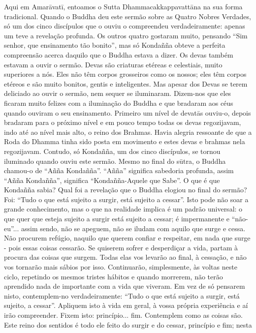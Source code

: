 Aqui em Amarāvatī, entoamos o Sutta Dhammacakkappavattāna na sua forma tradicional. Quando o Buddha deu
este sermão sobre as Quatro Nobres Verdades, só um dos
cinco discípulos que o ouviu o compreendeu verdadeiramente: apenas um teve a revelação profunda. Os outros quatro
gostaram muito, pensando “Sim senhor, que ensinamento tão
bonito”, mas só Kondañña obteve a perfeita compreensão
acerca daquilo que o Buddha estava a dizer.
Os devas também estavam a ouvir o sermão. Devas são
criaturas etéreas e celestiais, muito superiores a nós. Eles não
têm corpos grosseiros como os nossos; eles têm corpos etéreos
e são muito bonitos, gentis e inteligentes. Mas apesar dos
Devas se terem deliciado ao ouvir o sermão, nem sequer se
iluminaram.
Dizem-nos que eles ficaram muito felizes com a iluminação do Buddha e que bradaram aos céus quando ouviram o
seu ensinamento. Primeiro um nível de devatās ouviu-o,
depois bradaram para o próximo nível e em pouco tempo
todas os devas regozijavam, indo até ao nível mais alto, o
reino dos Brahmas. Havia alegria ressoante de que a Roda do
Dhamma tinha sido posta em movimento e estes devas e
brahmas nela regozijavam. Contudo, só Kondañña, um dos
cinco discípulos, se tornou iluminado quando ouviu este sermão. Mesmo no final do sūtra, o Buddha chamou-o de “Añña
Kondañña”. “Añña” significa sabedoria profunda, assim
“Añña Kondañña”, significa “Kondañña-Aquele que Sabe”.
O que é que Kondañña sabia? Qual foi a revelação que o
Buddha elogiou no final do sermão? Foi: “Tudo o que está
sujeito a surgir, está sujeito a cessar”. Isto pode não soar a
grande conhecimento, mas o que na realidade implica é um
padrão universal: o que quer que esteja sujeito a surgir está
sujeito a cessar; é impermanente e “não-eu”... assim sendo,
não se apeguem, não se iludam com aquilo que surge e cessa.
Não procurem refúgio, naquilo que querem confiar e
respeitar, em nada que surge - pois essas coisas cessarão.
Se quiserem sofrer e desperdiçar a vida, partam à procura
das coisas que surgem. Todas elas vos levarão ao final, à
cessação, e não vos tornarão mais sábios por isso.
Continuarão, simplesmente, às voltas neste ciclo, repetindo
os mesmos tristes hábitos e quando morrerem, não terão
aprendido nada de importante com a vida que viveram.
Em vez de só pensarem nisto, contemplem-no verdadeiramente: “Tudo o que está sujeito a surgir, está sujeito, a
cessar”. Apliquem isto à vida em geral, à vossa própria
experiência e aí irão compreender. Fixem isto: princípio...
fim. Contemplem como as coisas são. Este reino dos sentidos
é todo ele feito do surgir e do cessar, princípio e fim; nesta
